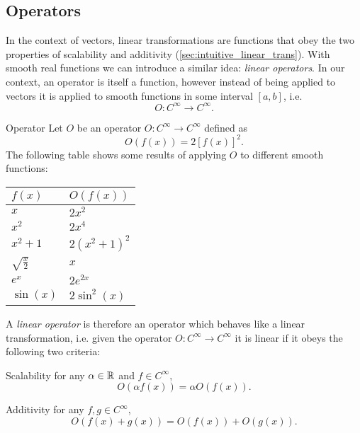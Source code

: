 \subsection{Operators}
In the context of vectors, linear transformations are functions that obey the two properties of scalability and additivity (\autoref{sec:intuitive_linear_trans}). With smooth real functions we can introduce a similar idea: \emph{linear operators}. In our context, an operator is itself a function, however instead of being applied to vectors it is applied to smooth functions in some interval $[a,b]$, i.e.
\begin{equation}
	O:C^{\infty}\to C^{\infty}.
	\label{eq:operator_definition}
\end{equation}

\begin{example}{Operator}{}
	Let $O$ be an operator $O:C^{\infty}\to C^{\infty}$ defined as
	\[
		O \left( f(x) \right) = 2\left[f(x)\right]^{2}.
	\]
	The following table shows some results of applying $O$ to different smooth functions:
	\begin{center}
		{\renewcommand*{\arraystretch}{1.5}
		\begin{tabular}{ll}
			\toprule
			$f(x)$ & $O \left( f(x) \right)$\\
			\midrule
			$x$ & $2x^{2}$\\
			$x^{2}$ & $2x^{4}$\\
			$x^{2}+1$ & $2 \left( x^{2}+1 \right)^{2}$\\
			$\sqrt{\frac{x}{2}}$ & $x$\\
			$e^{x}$ & $2e^{2x}$\\
			$\sin(x)$ & $2\sin^{2}(x)$\\
			\bottomrule
		\end{tabular}
	}
	\end{center}
\end{example}

A \emph{linear operator} is therefore an operator which behaves like a linear transformation, i.e. given the operator $O:C^{\infty}\to C^{\infty}$ it is linear if it obeys the following two criteria:
\begin{descitemize}
	\item[Scalability] for any $\alpha\in\mathbb{R}^{}$ and $f\in C^{\infty}$,
		\[
			O \left( \alpha f(x) \right) = \alpha O \left( f(x) \right).
		\]
	\item[Additivity] for any $f,g\in C^{\infty}$,
		\[
			O \left( f(x)+g(x) \right) = O \left( f(x) \right) + O \left( g(x) \right).
		\]
\end{descitemize}

